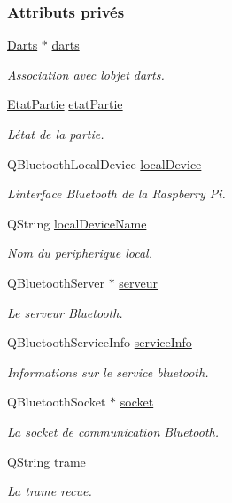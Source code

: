 \subsubsection*{Attributs privés}
\begin{DoxyCompactItemize}
\item 
\hyperlink{class_darts}{Darts} $\ast$ \hyperlink{class_communication_a494d609c206472041468e362d7cfc0e5}{darts}
\begin{DoxyCompactList}\small\item\em Association avec l\textquotesingle{}objet darts. \end{DoxyCompactList}\item 
\hyperlink{class_communication_aaa8ce2e87a389c88f4f9a2f07b66ebdd}{Etat\+Partie} \hyperlink{class_communication_a2539ded2780db2c732690c585c768c96}{etat\+Partie}
\begin{DoxyCompactList}\small\item\em L\textquotesingle{}état de la partie. \end{DoxyCompactList}\item 
Q\+Bluetooth\+Local\+Device \hyperlink{class_communication_a6281796eab7523bef6be1a766e0e906f}{local\+Device}
\begin{DoxyCompactList}\small\item\em L\textquotesingle{}interface Bluetooth de la Raspberry Pi. \end{DoxyCompactList}\item 
Q\+String \hyperlink{class_communication_aa70c6b4acb921b03ffa8b8b044e87a94}{local\+Device\+Name}
\begin{DoxyCompactList}\small\item\em Nom du peripherique local. \end{DoxyCompactList}\item 
Q\+Bluetooth\+Server $\ast$ \hyperlink{class_communication_a6384747297d6efa9e8fd2fc79ed0c269}{serveur}
\begin{DoxyCompactList}\small\item\em Le serveur Bluetooth. \end{DoxyCompactList}\item 
Q\+Bluetooth\+Service\+Info \hyperlink{class_communication_aa7f9ee5e5d90336a56857ebc229e4274}{service\+Info}
\begin{DoxyCompactList}\small\item\em Informations sur le service bluetooth. \end{DoxyCompactList}\item 
Q\+Bluetooth\+Socket $\ast$ \hyperlink{class_communication_aa4ddc3151b305db0135d5826384645cc}{socket}
\begin{DoxyCompactList}\small\item\em La socket de communication Bluetooth. \end{DoxyCompactList}\item 
Q\+String \hyperlink{class_communication_ac8f5004bfaaf7f538ba5ae93255f772b}{trame}
\begin{DoxyCompactList}\small\item\em La trame recue. \end{DoxyCompactList}\end{DoxyCompactItemize}


